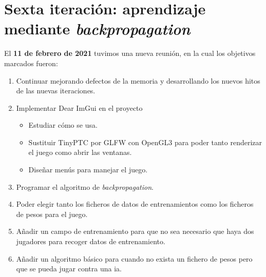 \section{Sexta iteración: aprendizaje mediante \textit{backpropagation}}
\label{sexta iteracion}
El \textbf{11 de febrero de 2021} tuvimos una nueva reunión, en la cual los objetivos marcados fueron:
\begin{enumerate}
	\item Continuar mejorando defectos de la memoria y desarrollando los nuevos hitos de las nuevas iteraciones.
	\item Implementar Dear ImGui en el proyecto
	\begin{itemize}
		\item Estudiar cómo se usa.
		\item Sustituir TinyPTC por GLFW con OpenGL3 para poder tanto renderizar el juego como abrir las ventanas.
		\item Diseñar menús para manejar el juego.
	\end{itemize}
	\item Programar el algoritmo de \textit{backpropagation}.
	\item Poder elegir tanto los ficheros de datos de entrenamientos como los ficheros de pesos para el juego.
	\item Añadir un campo de entrenamiento para que no sea necesario que haya dos jugadores para recoger datos de entrenamiento.
	\item Añadir un algoritmo básico para cuando no exista un fichero de pesos pero que se pueda jugar contra una \gls{ia}.
\end{enumerate}

